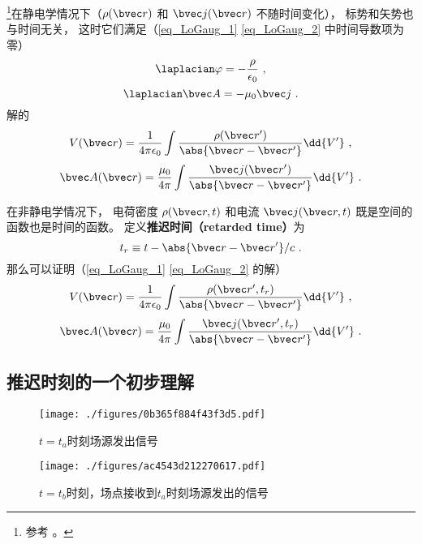 

\footnote{参考 \cite{GriffE}。}在静电学情况下（$\rho(\bvec r)$ 和 $\bvec j(\bvec r)$ 不随时间变化）， 标势和矢势也与时间无关， 这时它们满足（\autoref{eq_LoGaug_1}  \autoref{eq_LoGaug_2}  中时间导数项为零）
\begin{equation}
\laplacian \varphi = -\frac{\rho}{\epsilon_0}~,
\end{equation}
\begin{equation}
\laplacian \bvec A = -\mu_0 \bvec j~.
\end{equation}
解的
\begin{equation}
V(\bvec r) = \frac{1}{4\pi\epsilon_0} \int \frac{\rho(\bvec r')}{\abs{\bvec r - \bvec r'}} \dd{V'}~,
\end{equation}
\begin{equation}
\bvec A(\bvec r) = \frac{\mu_0}{4\pi} \int \frac{\bvec j(\bvec r')}{\abs{\bvec r - \bvec r'}} \dd{V'}~.
\end{equation}

在非静电学情况下， 电荷密度 $\rho(\bvec r, t)$ 和电流 $\bvec j(\bvec r, t)$ 既是空间的函数也是时间的函数。 定义\textbf{推迟时间（retarded time）}为
\begin{equation}
t_r \equiv t - \abs{\bvec r - \bvec r'}/c~.
\end{equation}
那么可以证明（\autoref{eq_LoGaug_1}  \autoref{eq_LoGaug_2} 的解）
\begin{equation}
V(\bvec r) = \frac{1}{4\pi\epsilon_0} \int \frac{\rho(\bvec r', t_r)}{\abs{\bvec r - \bvec r'}} \dd{V'}~,
\end{equation}
\begin{equation}
\bvec A(\bvec r) = \frac{\mu_0}{4\pi} \int \frac{\bvec j(\bvec r', t_r)}{\abs{\bvec r - \bvec r'}} \dd{V'}~.
\end{equation}

\subsection{推迟时刻的一个初步理解}
\begin{figure}[ht]
\centering
\texttt{[image: ./figures/0b365f884f43f3d5.pdf]}
\caption{$t=t_a$时刻场源发出信号} \label{fig_RetPt0_1}
\end{figure}
\begin{figure}[ht]
\centering
\texttt{[image: ./figures/ac4543d212270617.pdf]}
\caption{$t=t_b$时刻，场点接收到$t_a$时刻场源发出的信号} \label{fig_RetPt0_2}
\end{figure}

